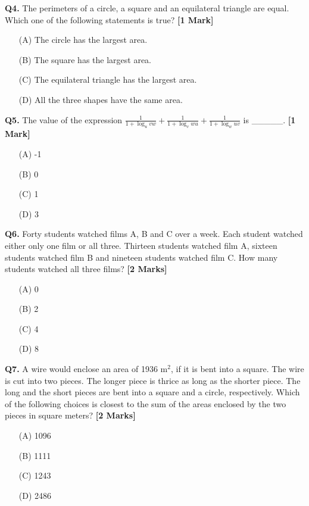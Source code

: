 \documentclass[11pt]{article}
\newcommand{\questiona}[2]{
    \noindent\textbf{Q#2.} #1 \hfill \textbf{[1 Mark]}
}
\newcommand{\questionb}[2]{
    \noindent\textbf{Q#2.} #1 \hfill \textbf{[2 Marks]}
}
\begin{document}
\questiona{The perimeters of a circle, a square and an equilateral triangle are equal. Which one of the following statements is true?}{4}
\begin{enumerate}
    \item[(A)] The circle has the largest area.
    \item[(B)] The square has the largest area.
    \item[(C)] The equilateral triangle has the largest area.
    \item[(D)] All the three shapes have the same area.
\end{enumerate}
\vspace{0.5cm}

\questiona{The value of the expression \( \frac{1}{1+\log_{u}vw} + \frac{1}{1+\log_{v}wu} + \frac{1}{1+\log_{w}uv} \) is \_\_\_\_\_.}{5}
\begin{enumerate}
    \item[(A)] -1
    \item[(B)] 0
    \item[(C)] 1
    \item[(D)] 3
\end{enumerate}
\vspace{0.5cm}

\questionb{Forty students watched films A, B and C over a week. Each student watched either only one film or all three. Thirteen students watched film A, sixteen students watched film B and nineteen students watched film C. How many students watched all three films?}{6}
\begin{enumerate}
    \item[(A)] 0
    \item[(B)] 2
    \item[(C)] 4
    \item[(D)] 8
\end{enumerate}
\vspace{0.5cm}

\questionb{A wire would enclose an area of 1936 m\(^2\), if it is bent into a square. The wire is cut into two pieces. The longer piece is thrice as long as the shorter piece. The long and the short pieces are bent into a square and a circle, respectively. Which of the following choices is closest to the sum of the areas enclosed by the two pieces in square meters?}{7}
\begin{enumerate}
    \item[(A)] 1096
    \item[(B)] 1111
    \item[(C)] 1243
    \item[(D)] 2486
\end{enumerate}
\vspace{0.5cm}
\end{document}
